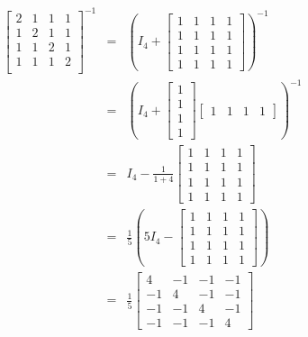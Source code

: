 \documentclass[letterpaper,12pt,fleqn]{article}
\begin{document}
\begin{example}
  \listbreak
  \begin{eqnarray*}
    \begin{bmatrix}
      2 & 1 & 1 & 1 \\
      1 & 2 & 1 & 1 \\
      1 & 1 & 2 & 1 \\
      1 & 1 & 1 & 2 \\
    \end{bmatrix}^{-1} &=& \left(I_4+\begin{bmatrix}
    1 & 1 & 1 & 1 \\
    1 & 1 & 1 & 1 \\
    1 & 1 & 1 & 1 \\
    1 & 1 & 1 & 1
    \end{bmatrix}\right)^{-1} \\
    &=& \left(I_4+\begin{bmatrix} 1 \\ 1 \\ 1 \\ 1 \end{bmatrix}
    \begin{bmatrix} 1 & 1 & 1 & 1 \end{bmatrix}\right)^{-1} \\
    &=& I_4-\frac{1}{1+4}
    \begin{bmatrix}
      1 & 1 & 1 & 1 \\
      1 & 1 & 1 & 1 \\
      1 & 1 & 1 & 1 \\
      1 & 1 & 1 & 1
    \end{bmatrix} \\
    &=& \frac{1}{5}\left(5I_4-\begin{bmatrix}
      1 & 1 & 1 & 1 \\
      1 & 1 & 1 & 1 \\
      1 & 1 & 1 & 1 \\
      1 & 1 & 1 & 1
    \end{bmatrix}\right) \\
    &=& \frac{1}{5}\begin{bmatrix}
      4 & -1 & -1 & -1 \\
      -1 & 4 & -1 & -1 \\
      -1 & -1 & 4 & -1 \\
      -1 & -1 & -1 & 4
    \end{bmatrix}
  \end{eqnarray*}
\end{example}
\end{document}
